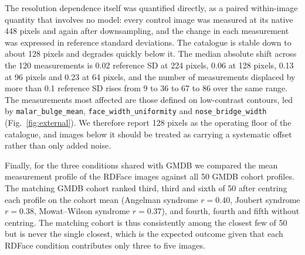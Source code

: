 \documentclass[11pt]{article}
\begin{document}
The resolution dependence itself was quantified directly, as a paired
within-image quantity that involves no model: every control image was measured
at its native 448 pixels and again after downsampling, and the change in each
measurement was expressed in reference standard deviations. The catalogue is
stable down to about 128 pixels and degrades quickly below it. The median
absolute shift across the 120 measurements is 0.02 reference SD at 224 pixels,
0.06 at 128 pixels, 0.13 at 96 pixels and 0.23 at 64 pixels, and the number of
measurements displaced by more than 0.1 reference SD rises from 9 to 36 to 67
to 86 over the same range. The measurements most affected are those defined on
low-contrast contours, led by \texttt{malar\_bulge\_mean},
\texttt{face\_width\_uniformity} and \texttt{nose\_bridge\_width}
(Fig.~\ref{fig:external}). We therefore
report 128 pixels as the operating floor of the catalogue, and images below it
should be treated as carrying a systematic offset rather than only added noise.

Finally, for the three conditions shared with GMDB we compared the mean
measurement profile of the RDFace images against all 50 GMDB cohort profiles.
The matching GMDB cohort ranked third, third and sixth of 50 after centring
each profile on the cohort mean (Angelman syndrome $r = 0.40$, Joubert syndrome
$r = 0.38$, Mowat--Wilson syndrome $r = 0.37$), and fourth, fourth and fifth
without centring. The matching cohort is thus consistently among the closest
few of 50 but is never the single closest, which is the expected outcome given
that each RDFace condition contributes only three to five images.
\end{document}
